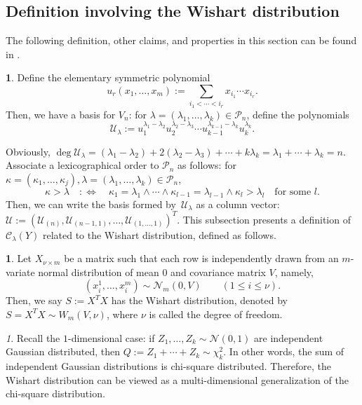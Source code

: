 \documentclass{mathincs}
\numberwithin{equation}{section}
\numberwithin{figure}{section}
\theoremstyle{plain}
\theoremstyle{definition}
\newtheorem{defn}[thm]{\protect\definitionname}
\theoremstyle{remark}
\newtheorem{rem}[thm]{\protect\remarkname}
\theoremstyle{plain}
\theoremstyle{definition}
\theoremstyle{plain}
\theoremstyle{plain}
\providecommand{\definitionname}{Definition}
\providecommand{\remarkname}{Remark}
\begin{document}
\subsection{Definition involving the Wishart distribution}\label{sec:Wishart}
The following definition, other claims, and properties in this section
can be found in \cite[pp.~9--22]{Takemura}.
\begin{defn}
Define the elementary symmetric polynomial
\[
  u_{r}(x_{1},\ldots,x_{m}):=\underset{i_{1}<\cdots<i_{r}}{\sum}x_{i_{1}}\cdots x_{i_{r}}.
\]
Then, we have a basis for $V_n$: for $\lambda=\left(\lambda_{1},\ldots,\lambda_{k}\right)\in\mathcal{P}_{n}$, define the polynomials
\[
  \mathcal{U}_{\lambda} :=
  u_{1}^{\lambda_{1}-\lambda_{2}}u_{2}^{\lambda_{2}-\lambda_{3}}\cdots u_{k-1}^{\lambda_{k-1}-\lambda_{k}}u_{k}^{\lambda_{k}}.
\]
\end{defn}
\noindent
Obviously,
$\deg\mathcal{U}_{\lambda} =
  \left(\lambda_{1}-\lambda_{2}\right)+2\left(\lambda_{2}-\lambda_{3}\right)+\cdots+k\lambda_{k} =
  \lambda_{1}+\cdots+\lambda_{k}=n$.
Associate a lexicographical order to $\mathcal{P}_{n}$ as follows:
for $\kappa=\left(\kappa_1,\ldots,\kappa_j\right),\lambda=\left(\lambda_1,\ldots,\lambda_k\right)\in\mathcal{P}_{n}$,
\[
  \kappa>\lambda \quad:\Leftrightarrow\quad
  \kappa_1=\lambda_1\land\cdots\land\kappa_{l-1}=\lambda_{l-1}\land\kappa_{l}>\lambda_{l}
  \quad\text{for some }l.
\]
Then, we can write the basis formed by~$\mathcal{U}_{\lambda}$
as a column vector:
$
\mathcal{U}:=\left(\mathcal{U}_{\left(n\right)},\mathcal{U}_{\left(n-1,1\right)},\ldots,\mathcal{U}_{\left(1,\ldots,1\right)}\right)^{T}\!\!.
$
This subsection presents a definition of $\mathcal{C}_{\lambda}(Y)$
related to the Wishart distribution, defined as follows.
\begin{defn}
Let $X_{\nu\times m}$ be a matrix such that each row is independently drawn
from an $m$-variate normal distribution of mean $0$ and covariance
matrix $V$, namely, 
\[
  \left(x_{i}^{1},\ldots,x_{i}^{m}\right)\sim\mathcal{N}_{m}(0,V)
  \qquad (1\leq i\leq\nu).
\]
Then, we say $S:=X^{T}X$ has the Wishart distribution, denoted by $S=X^{T}X\sim W_{m}(V,\nu)$, where $\nu$ is called the degree of freedom.
\end{defn}
\begin{rem}
Recall the $1$-dimensional case: if $Z_{1},\ldots,Z_{k}\sim\mathcal{N}(0,1)$
are independent Gaussian distributed, then $Q:=Z_{1}+\cdots+Z_{k}\sim\chi_{k}^{2}$.
In other words, the sum of independent Gaussian distributions is chi-square
distributed. Therefore, the Wishart distribution can be viewed as a multi-dimensional
generalization of the chi-square distribution.
\end{rem}
\end{document}
